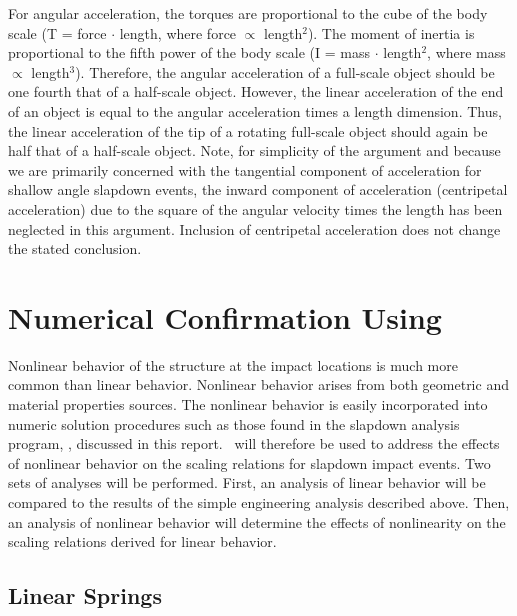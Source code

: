      For angular acceleration, the torques are proportional to the
cube of the body scale 
(T = force $\cdot$ length, where force $\propto$ length$^{2}$).
The moment of inertia is
proportional to the fifth power of the body scale 
(I = mass $\cdot$ length$^{2}$, where mass $\propto$ length$^{3}$).
Therefore, the angular acceleration of a full-scale object
should be one fourth that of a half-scale object.  However, the linear
acceleration of the end of an object is equal to the angular
acceleration times a length dimension.  Thus, the linear acceleration
of the tip of a rotating full-scale object should again be half that
of a half-scale object.  Note, for simplicity of the argument and
because we are primarily concerned with the tangential component of
acceleration for shallow angle slapdown events, the inward component
of acceleration (centripetal acceleration) due to the square of the
angular velocity times the length has been neglected in this argument.
Inclusion of centripetal acceleration does not change the stated
conclusion. 

\section{Numerical Confirmation Using \SLAP}

     Nonlinear behavior of the structure at the impact locations is
much more common than linear behavior.  Nonlinear behavior arises from
both geometric and material properties sources.  The nonlinear
behavior is easily incorporated into numeric solution procedures such
as those found in the slapdown analysis program, \SLAP , discussed in
this report.  \SLAP\ will therefore be used to address the effects
of nonlinear behavior on the scaling relations for slapdown impact
events.  Two sets of analyses will be performed.  First, an analysis
of linear behavior will be compared to the results of the simple
engineering analysis described above.  Then, an analysis of nonlinear
behavior will determine the effects of nonlinearity on the scaling
relations derived for linear behavior. 

\subsection{Linear Springs}


